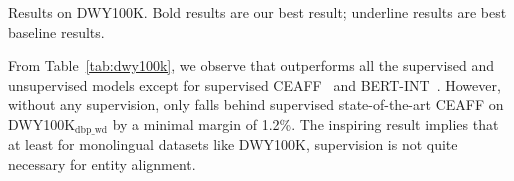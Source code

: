 


\begin{table}[t]
	\centering
	\renewcommand\tabcolsep{9pt}
	\renewcommand\arraystretch{0.95}
	\caption{Results on DWY100K. \textmd{Bold results are our best result; underline results are best baseline results.}}
	
	\label{tab:dwy100k}
\end{table}

From Table~\ref{tab:dwy100k}, we observe that \solution outperforms all the supervised and unsupervised models except for supervised CEAFF~\cite{CEAFF} and BERT-INT~\cite{tang2019bert-int}. However, without any supervision, \solution only falls behind supervised state-of-the-art CEAFF on DWY100K$_{\text{dbp\_wd}}$ by a minimal margin of 1.2\%.  The inspiring result implies that at least for monolingual datasets like DWY100K, supervision is not quite necessary for entity alignment.



